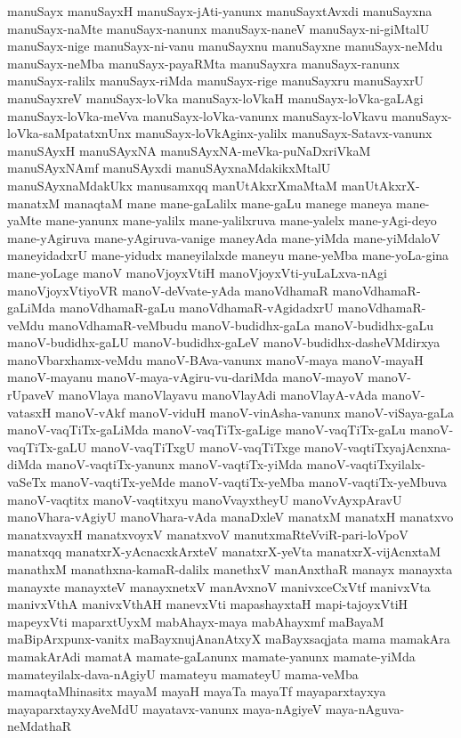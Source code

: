 {manuSayx
manuSayxH
manuSayx-jAti-yanunx
manuSayxtAvxdi
manuSayxna
manuSayx-naMte
manuSayx-nanunx
manuSayx-naneV
manuSayx-ni-giMtalU
manuSayx-nige
manuSayx-ni-vanu
manuSayxnu
manuSayxne
manuSayx-neMdu
manuSayx-neMba
manuSayx-payaRMta
manuSayxra
manuSayx-ranunx
manuSayx-ralilx
manuSayx-riMda
manuSayx-rige
manuSayxru
manuSayxrU
manuSayxreV
manuSayx-loVka
manuSayx-loVkaH
manuSayx-loVka-gaLAgi
manuSayx-loVka-meVva
manuSayx-loVka-vanunx
manuSayx-loVkavu
manuSayx-loVka-saMpatatxnUnx
manuSayx-loVkAginx-yalilx
manuSayx-Satavx-vanunx
manuSAyxH
manuSAyxNA
manuSAyxNA-meVka-puNaDxriVkaM
manuSAyxNAmf
manuSAyxdi
manuSAyxnaMdakikxMtalU
manuSAyxnaMdakUkx
manusamxqq
manUtAkxrXmaMtaM
manUtAkxrX-manatxM
manaqtaM
mane
mane-gaLalilx
mane-gaLu
manege
maneya
mane-yaMte
mane-yanunx
mane-yalilx
mane-yalilxruva
mane-yalelx
mane-yAgi-deyo
mane-yAgiruva
mane-yAgiruva-vanige
maneyAda
mane-yiMda
mane-yiMdaloV
maneyidadxrU
mane-yidudx
maneyilalxde
maneyu
mane-yeMba
mane-yoLa-gina
mane-yoLage
manoV
manoVjoyxVtiH
manoVjoyxVti-yuLaLxva-nAgi
manoVjoyxVtiyoVR
manoV-deVvate-yAda
manoVdhamaR
manoVdhamaR-gaLiMda
manoVdhamaR-gaLu
manoVdhamaR-vAgidadxrU
manoVdhamaR-veMdu
manoVdhamaR-veMbudu
manoV-budidhx-gaLa
manoV-budidhx-gaLu
manoV-budidhx-gaLU
manoV-budidhx-gaLeV
manoV-budidhx-dasheVMdirxya
manoVbarxhamx-veMdu
manoV-BAva-vanunx
manoV-maya
manoV-mayaH
manoV-mayanu
manoV-maya-vAgiru-vu-dariMda
manoV-mayoV
manoV-rUpaveV
manoVlaya
manoVlayavu
manoVlayAdi
manoVlayA-vAda
manoV-vatasxH
manoV-vAkf
manoV-viduH
manoV-vinAsha-vanunx
manoV-viSaya-gaLa
manoV-vaqTiTx-gaLiMda
manoV-vaqTiTx-gaLige
manoV-vaqTiTx-gaLu
manoV-vaqTiTx-gaLU
manoV-vaqTiTxgU
manoV-vaqTiTxge
manoV-vaqtiTxyajAcnxna-diMda
manoV-vaqtiTx-yanunx
manoV-vaqtiTx-yiMda
manoV-vaqtiTxyilalx-vaSeTx
manoV-vaqtiTx-yeMde
manoV-vaqtiTx-yeMba
manoV-vaqtiTx-yeMbuva
manoV-vaqtitx
manoV-vaqtitxyu
manoVvayxtheyU
manoVvAyxpAravU
manoVhara-vAgiyU
manoVhara-vAda
manaDxleV
manatxM
manatxH
manatxvo
manatxvayxH
manatxvoyxV
manatxvoV
manutxmaRteVviR-pari-loVpoV
manatxqq
manatxrX-yAcnacxkArxteV
manatxrX-yeVta
manatxrX-vijAcnxtaM
manathxM
manathxna-kamaR-dalilx
manethxV
manAnxthaR
manayx
manayxta
manayxte
manayxteV
manayxnetxV
manAvxnoV
manivxceCxVtf
manivxVta
manivxVthA
manivxVthAH
manevxVti
mapashayxtaH
mapi-tajoyxVtiH
mapeyxVti
maparxtUyxM
mabAhayx-maya
mabAhayxmf
maBayaM
maBipArxpunx-vanitx
maBayxnujAnanAtxyX
maBayxsaqjata
mama
mamakAra
mamakArAdi
mamatA
mamate-gaLanunx
mamate-yanunx
mamate-yiMda
mamateyilalx-dava-nAgiyU
mamateyu
mamateyU
mama-veMba
mamaqtaMhinasitx
mayaM
mayaH
mayaTa
mayaTf
mayaparxtayxya
mayaparxtayxyAveMdU
mayatavx-vanunx
maya-nAgiyeV
maya-nAguva-neMdathaR
}
